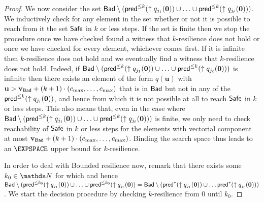 \begin{proof}
We now consider the set 
$\textsf{Bad} \setminus (\textsf{pred}^{\leq k}(\uparrow q_{j_1}(\textbf{0})) \cup \ldots \cup \textsf{pred}^{\leq k}(\uparrow q_{j_\ell}(\textbf{0})) )$.
We inductively check for any element in the set whether or not it is possible to reach from it the set $\textsf{Safe}$ in $k$ or less steps.
If the set is finite then we stop the procedure once we have checked found a witness that $k$-resilience does not hold or once we have checked for every element, whichever comes first.
If it is infinite then
$k$-resilience does not hold 
and we eventually find a witness that $k$-resilience does not hold.
Indeed, 
if
$\textsf{Bad} \setminus (\textsf{pred}^{\leq k}(\uparrow q_{j_1}(\textbf{0})) \cup \ldots \cup \textsf{pred}^{\leq k}(\uparrow q_{j_\ell}(\textbf{0})) )$
is
infinite
then
there exists an element of the form $q(\textbf{u} )$
with $\textbf{u} > \textbf{v}_{\textsf{Bad}} + (k+1) \cdot (c_{\max}, \ldots, c_{\max})$ 
that is in $\textsf{Bad}$ but not in any of the $\textsf{pred}^{\leq k}(\uparrow q_{j_i}(\textbf{0}))$,
and hence from which it is not possible at all to reach
$\textsf{Safe}$ in $k$ or less steps. This also means that, even in the case where $\textsf{Bad} \setminus (\textsf{pred}^{\leq k}(\uparrow q_{j_1}(\textbf{0})) \cup \ldots \cup \textsf{pred}^{\leq k}(\uparrow q_{j_\ell}(\textbf{0})) )$ is finite, we only need to check reachability of $\textsf{Safe}$ in $k$ or less steps for the elements with vectorial component at most
$ \textbf{v}_{\textsf{Bad}} + (k+1) \cdot (c_{\max}, \ldots, c_{\max})$. Binding the search space
thus leads to an $\EXPSPACE$ upper bound for {\sc $k$-resilience}.


In order to deal with {\sc Bounded resilience} now, remark that there exists some $k_0 \in \N$ for which
and hence
$\textsf{Bad} \setminus (\textsf{pred}^{\leq k_0}(\uparrow q_{j_1}(\textbf{0}))\cup \ldots \cup \textsf{pred}^{\leq k_0}(\uparrow q_{j_\ell}(\textbf{0}))= 
\textsf{Bad} \setminus (\textsf{pred}^{*}(\uparrow q_{j_1}(\textbf{0})) \cup \ldots \textsf{pred}^{*}(\uparrow q_{j_\ell}(\textbf{0})) )$.
We start the decision procedure by checking {\sc $k$-resilience} from $0$ until $k_0$.


\end{proof}

